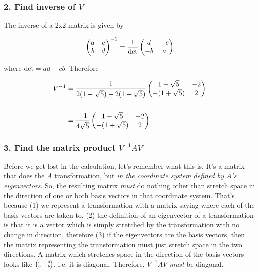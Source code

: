 \subsubsection{2. Find inverse of $V$}

The inverse of a 2x2 matrix is given by

$$
\begin{pmatrix}a & c\\b & d\\ \end{pmatrix} ^ {-1}
=
\frac{1}{\text{det}} \begin{pmatrix}d & -c\\-b & a\\ \end{pmatrix}
$$

where $\text{det} = ad - cb$. Therefore

\begin{align*}
V^{-1}
&= \frac{1}{2(1 - \sqrt 5) - 2(1 + \sqrt 5)} \begin{pmatrix}1 - \sqrt 5  & -2\\-(1 + \sqrt 5) & 2\\ \end{pmatrix}
\\\\
&= \frac{-1}{4\sqrt 5} \begin{pmatrix}1 - \sqrt 5  & -2\\-(1 + \sqrt 5) & 2\\ \end{pmatrix}
\end{align*}


\subsubsection{3. Find the matrix product $V^{-1}AV$}

Before we get lost in the calculation, let's remember what this is. It's a
matrix that does the $A$ transformation, but \textit{in the coordinate system defined
by $A$'s eigenvectors}. So, the resulting matrix \textit{must} do nothing other than
stretch space in the direction of one or both basis vectors in that coordinate
system. That's because (1) we represent a transformation with a matrix saying
where each of the basis vectors are taken to, (2) the definition of an
eigenvector of a transformation is that it is a vector which is simply
stretched by the transformation with no change in direction, therefore (3) if
the eigenvectors are the basis vectors, then the matrix representing the
transformation must just stretch space in the two directions. A matrix which
stretches space in the direction of the basis vectors looks like
$\tiny{\begin{pmatrix}a & 0\\0 & b\\ \end{pmatrix}}$, i.e. it is diagonal. Therefore, $V^{-1}AV$ \textit{must} be
diagonal.

